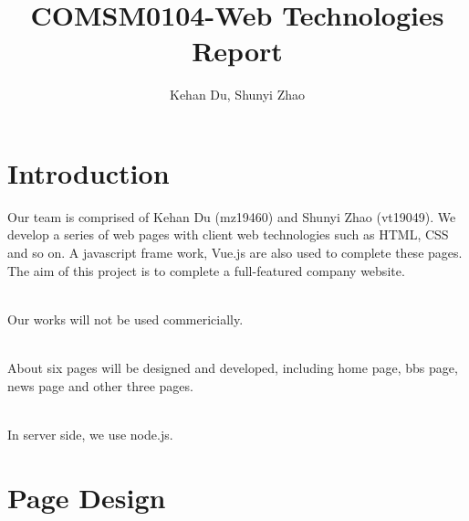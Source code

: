 \documentclass{article}
\title{COMSM0104-Web Technologies Report}
\author{Kehan Du, Shunyi Zhao}
\begin{document}
\maketitle

\section{Introduction}
Our team is comprised of Kehan Du (mz19460) and Shunyi Zhao (vt19049). 
We develop a series of web pages with client web technologies such as 
HTML, CSS and so on. A javascript frame work, Vue.js are also used to 
complete these pages. The aim of this project is to complete a full-featured
company website. 

~\\
\noindent
Our works will not be used commericially. 

~\\
\noindent
About six pages will be designed and developed, including home page, 
bbs page, news page and other three pages.

~\\
\noindent
In server side, we use node.js.
\section{Page Design}



    
\end{document}
